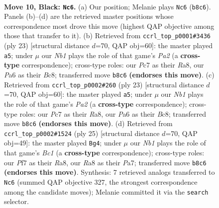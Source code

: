 \documentclass[11pt]{article}
\begin{document}
\clearpage

\begin{figure}[p]\centering
\begin{subfigure}{0.46\textwidth}\centering
\resizebox{\linewidth}{!}{%
\newchessgame
\chessboard[
  setfen={rnb1qrk1/1ppn1ppp/p3p3/3pP3/3P1P2/2N4N/PPP2KPP/R2Q1BR1 b - - 5 10},
  showmover=false,
  pgfstyle=straightmove, color=movearrow, markmove={b8-c6}
]}
\caption{}
\end{subfigure}\hfill
\begin{subfigure}{0.46\textwidth}\centering
\resizebox{\linewidth}{!}{%
\newchessgame
\chessboard[
  setfen={r1b1r1k1/pp1nqpbp/2pp1np1/8/2PNPB2/2N3P1/PPQ2PBP/R2R2K1 b - - 4 12},
  showmover=false,
  pgfstyle=straightmove, color=movearrow, markmove={a7-a5}
]}
\caption{}
\end{subfigure}
\\[4pt]
\begin{subfigure}{0.46\textwidth}\centering
\resizebox{\linewidth}{!}{%
\newchessgame
\chessboard[
  setfen={r1b1r1k1/pp1nqpbp/2pp1np1/8/2PNPB2/2N3P1/PPQ2PBP/R2R2K1 b - - 1 12},
  showmover=false,
  pgfstyle=straightmove, color=movearrow, markmove={a7-a5}
]}
\caption{}
\end{subfigure}\hfill
\begin{subfigure}{0.46\textwidth}\centering
\resizebox{\linewidth}{!}{%
\newchessgame
\chessboard[
  setfen={r1b1r1k1/pp2qpbp/3p1np1/2p1n3/2P1P3/2N3P1/PPN1QPBP/R1BR2K1 b - - 1 13},
  showmover=false,
  pgfstyle=straightmove, color=movearrow, markmove={c8-g4}
]}
\caption{}
\end{subfigure}
\caption{\textbf{Move 10, Black: \texttt{Nc6}.} (a) Our position; Melanie plays \texttt{Nc6} (\texttt{b8c6}). Panels (b)--(d) are the retrieved master positions whose correspondence most drove this move (highest QAP objective among those that transfer to it). (b) Retrieved from \texttt{ccrl\_top\_p0001\#3436} (ply 23) [structural distance $d$=70, QAP obj=60]: the master played \texttt{a5}; under $\mu$ our \emph{Nb1} plays the role of that game's \emph{Pa2} (a \textbf{cross-type} correspondence); cross-type roles: our \emph{P}c7 as their \emph{R}a8, our \emph{P}a6 as their \emph{B}c8; transferred move \texttt{b8c6} \textbf{(endorses this move)}. (c) Retrieved from \texttt{ccrl\_top\_p0002\#260} (ply 23) [structural distance $d$=70, QAP obj=60]: the master played \texttt{a5}; under $\mu$ our \emph{Nb1} plays the role of that game's \emph{Pa2} (a \textbf{cross-type} correspondence); cross-type roles: our \emph{P}c7 as their \emph{R}a8, our \emph{P}a6 as their \emph{B}c8; transferred move \texttt{b8c6} \textbf{(endorses this move)}. (d) Retrieved from \texttt{ccrl\_top\_p0002\#1524} (ply 25) [structural distance $d$=70, QAP obj=49]: the master played \texttt{Bg4}; under $\mu$ our \emph{Nb1} plays the role of that game's \emph{Bc1} (a \textbf{cross-type} correspondence); cross-type roles: our \emph{P}f7 as their \emph{R}a8, our \emph{R}a8 as their \emph{P}a7; transferred move \texttt{b8c6} \textbf{(endorses this move)}. Synthesis: 7 retrieved analogs transferred to \texttt{Nc6} (summed QAP objective 327, the strongest correspondence among the candidate moves); Melanie committed it via the \texttt{search} selector.}

\end{figure}
\end{document}
